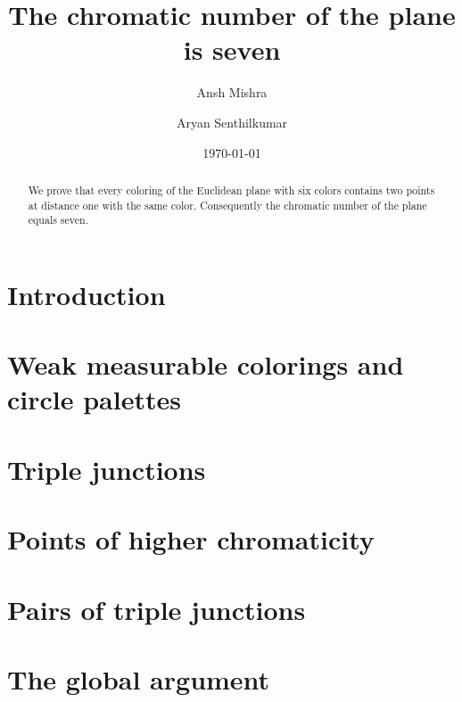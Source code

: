 \documentclass[11pt]{amsart}
\title{The chromatic number of the plane is seven}
\author{Ansh Mishra}
\author{Aryan Senthilkumar}
\date{\today}
\theoremstyle{definition}
\theoremstyle{remark}
\begin{document}
\begin{abstract}
We prove that every coloring of the Euclidean plane with six colors contains two
points at distance one with the same color. Consequently the chromatic number of
the plane equals seven.
\end{abstract}
\maketitle

\section{Introduction}

\section{Weak measurable colorings and circle palettes}

\section{Triple junctions}

\section{Points of higher chromaticity}

\section{Pairs of triple junctions}

\section{The global argument}



\end{document}
